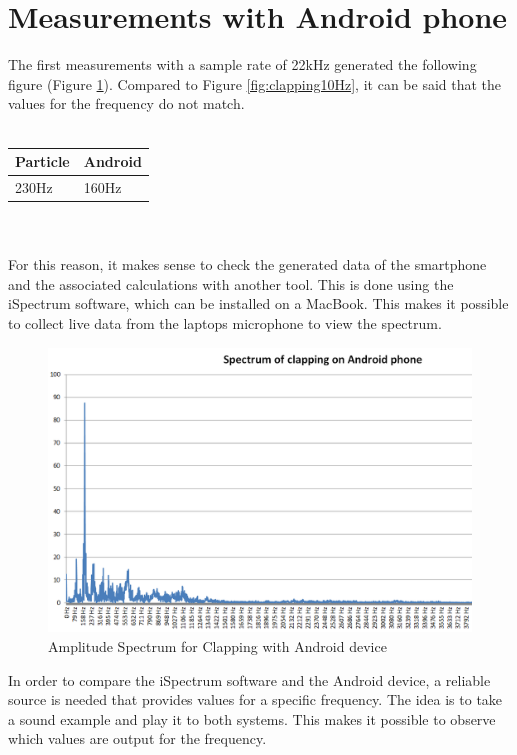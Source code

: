 \section{Measurements with Android phone}
The first measurements with a sample rate of 22kHz generated the following figure (Figure \ref{fig:clappingAndroid}). Compared to Figure \ref{fig:clapping10Hz}, it can be said that the values for the frequency do not match. 
\\\\
\begin{tabular}{|l|l|}
	\hline
	\textbf{Particle} & \textbf{Android} \\
	\hline
	230Hz & 160Hz\\
	\hline
\end{tabular}
\\\\
For this reason, it makes sense to check the generated data of the smartphone and the associated calculations with another tool. This is done using the iSpectrum software, which can be installed on a MacBook. This makes it possible to collect live data from the laptops microphone to view the spectrum. 
\newpage
\begin{figure}[h]
	\centering
	\includegraphics[width=\textwidth]{imgs/clappingAndroid}
	\caption{Amplitude Spectrum for Clapping with Android device}
	\label{fig:clappingAndroid}
\end{figure}
In order to compare the iSpectrum software and the Android device, a reliable source is needed that provides values for a specific frequency. The idea is to take a sound example and play it to both systems. This makes it possible to observe which values are output for the frequency.
\\
